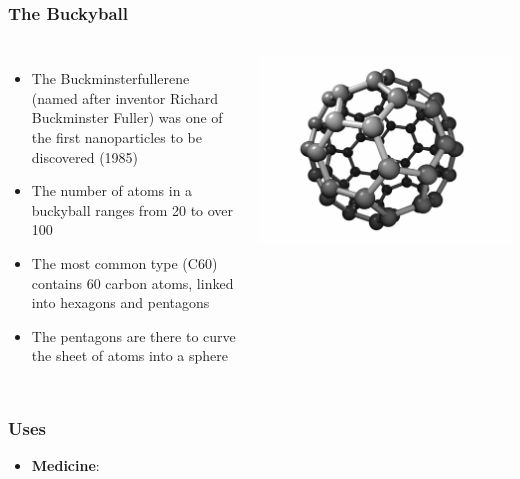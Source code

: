 \documentclass{beamer}
\begin{document}
\begin{frame}
	\frametitle{The Buckyball}
	\begin{columns}
		\begin{itemize}
			\item The Buckminsterfullerene (named after inventor Richard Buckminster Fuller) was one of the first nanoparticles to be discovered (1985)
			
			\item The number of atoms in a buckyball ranges from 20 to over 100
			
			\item The most common type (C60) contains 60 carbon atoms, linked into hexagons and pentagons
			
			\item The pentagons are there to curve the sheet of atoms into a sphere
		\end{itemize}
		\includegraphics[scale=.2]{buckyball_white}
	\end{columns}
\end{frame}

\begin{frame}
	\frametitle{Uses}
	\begin{itemize}
		\item \textbf{Medicine}: 
	\end{itemize}
\end{frame}
\end{document}
